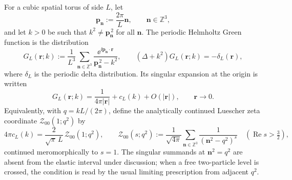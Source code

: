 \begin{definition}
\label{def:qcd-periodic-green-zeta-coordinate}
For a cubic spatial torus of side \(L\), let
\[
  \mathbf p_{\mathbf n}:=\frac{2\pi}{L}\mathbf n,\qquad
  \mathbf n\in\mathbb Z^3,
\]
and let \(k>0\) be such that \(k^2\ne \mathbf p_{\mathbf n}^{\,2}\) for all
\(\mathbf n\).  The periodic Helmholtz Green function is the distribution
\begin{equation}
  G_L(\mathbf r;k)
  :=
  \frac1{L^3}
  \sum_{\mathbf n\in\mathbb Z^3}
  \frac{\ee^{\ii\mathbf p_{\mathbf n}\cdot\mathbf r}}
       {\mathbf p_{\mathbf n}^{\,2}-k^2},
  \qquad
  (\Delta+k^2)G_L(\mathbf r;k)=-\delta_L(\mathbf r),
  \label{eq:qcd-periodic-helmholtz-green}
\end{equation}
where \(\delta_L\) is the periodic delta distribution.  Its singular expansion
at the origin is written
\begin{equation}
  G_L(\mathbf r;k)
  =
  \frac{1}{4\pi|\mathbf r|}
  +
  c_L(k)
  +O(|\mathbf r|),
  \qquad
  \mathbf r\to0.
  \label{eq:qcd-periodic-green-constant-term}
\end{equation}
Equivalently, with \(q=kL/(2\pi)\), define the analytically continued
Luescher zeta coordinate \(\mathcal Z_{00}(1;q^2)\) by
\begin{equation}
  4\pi c_L(k)
  =
  \frac{2}{\sqrt\pi\,L}\,
  \mathcal Z_{00}(1;q^2),
  \qquad
  \mathcal Z_{00}(s;q^2)
  :=
  \frac1{\sqrt{4\pi}}
  \sum_{\mathbf n\in\mathbb Z^3}
  \frac{1}{(\mathbf n^2-q^2)^s}
  \quad(\operatorname{Re}s>\tfrac32),
  \label{eq:qcd-luscher-zeta-coordinate}
\end{equation}
continued meromorphically to \(s=1\).  The singular summands at
\(\mathbf n^2=q^2\) are absent from the elastic interval under discussion;
when a free two-particle level is crossed, the condition is read by the usual
limiting prescription from adjacent \(q^2\).
\end{definition}

